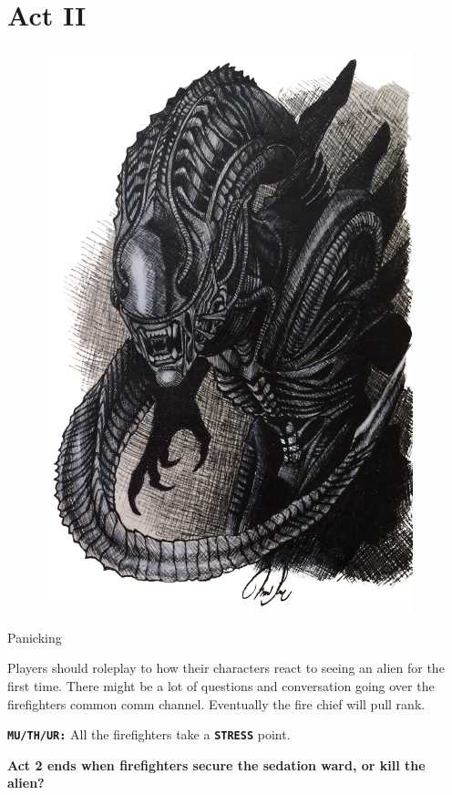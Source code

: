 \chapter{Act II}




\begin{figure}
   \centering
   \includegraphics[width=.45\textwidth]{img/bg/alien.png}
   \label{fig:refinery}
\end{figure}


\begin{rpg-commentbox}{Panicking}
   
   Players should roleplay to how their characters react to seeing an alien for the first time. There might be a lot of questions and conversation going over the firefighters common comm channel. Eventually the fire chief will pull rank.

   \texttt{\textbf{MU/TH/UR:}} All the firefighters take a \texttt{\textbf{STRESS}} point.

\end{rpg-commentbox}    


\begin{rpg-commentbox}{}
   \textbf{Act 2 ends when firefighters secure the sedation ward, or kill the alien?}
\end{rpg-commentbox}

\newsect





